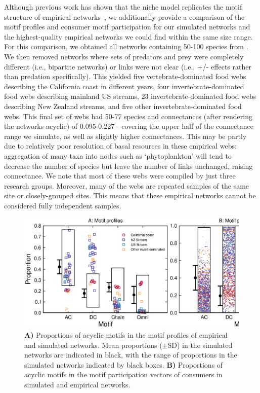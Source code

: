 \documentclass[12pt]{article}
\begin{document}
\begin{spacing}{2.0}
        Although previous work has shown that the niche model replicates the motif structure of empirical networks~\citep{Stouffer2005a,Stouffer2006}, we additionally provide a comparison of the motif profiles and consumer motif participation for our simulated networks and the highest-quality empirical networks we could find within the same size range.
        For this comparison, we obtained all networks containing 50-100 species from \citet{globalwebdb}.
        We then removed networks where sets of predators and prey were completely different (i.e., bipartite networks) or links were not clear (i.e., +/- effects rather than predation specifically).
        This yielded five vertebrate-dominated food webs describing the California coast in different years, four invertebrate-dominated food webs describing mainland US streams, 23 invertebrate-dominated food webs describing New Zealand streams, and five other invertebrate-dominated food webs.
        This final set of webs had 50-77 species and connectances (after rendering the networks acyclic) of 0.095-0.227 - covering the upper half of the connectance range we simulate, as well as slightly higher connectances.
        This may be partly due to relatively poor resolution of basal resources in these empirical webs: aggregation of many taxa into nodes such as `phytoplankton' will tend to decrease the number of species but leave the number of links unchanged, raising connectance.
        We note that most of these webs were compiled by just three research groups.
        Moreover, many of the webs are repeated samples of the same site  or closely-grouped sites.
        This means that these empirical networks cannot be considered fully independent samples.
        
        
        \begin{figure}
            \centering
            \includegraphics[width=\textwidth]{figures/motif_profiles_participation_vs_empirical.eps}
            \caption{\textbf{A)} Proportions of acyclic motifs in the motif profiles of empirical and simulated networks. Mean proportions ($\pm$SD) in the simulated networks are indicated in black, with the range of proportions in the simulated networks indicated by black boxes. \textbf{B)} Proportions of acyclic motifs in the motif participation vectors of consumers in simulated and empirical networks.}
            \label{empirical_compare}
        \end{figure}
        

\end{spacing}
\end{document}
